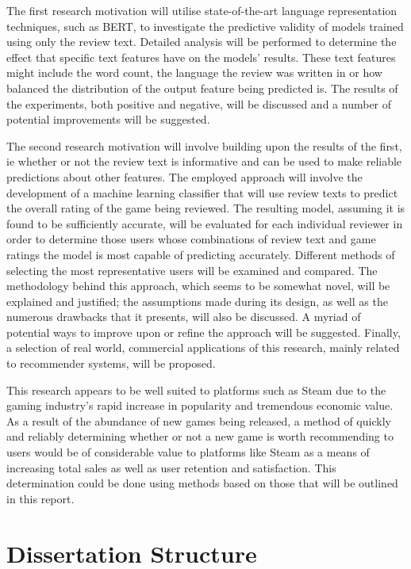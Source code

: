 The first research motivation will utilise state-of-the-art language representation techniques, such as BERT, to investigate the predictive validity of models trained using only the review text. Detailed analysis will be performed to determine the effect that specific text features have on the models' results. These text features might include the word count, the language the review was written in or how balanced the distribution of the output feature being predicted is. The results of the experiments, both positive and negative, will be discussed and a number of potential improvements will be suggested.

The second research motivation will involve building upon the results of the first, ie whether or not the review text is informative and can be used to make reliable predictions about other features. The employed approach will involve the development of a machine learning classifier that will use review texts to predict the overall rating of the game being reviewed. The resulting model, assuming it is found to be sufficiently accurate, will be evaluated for each individual reviewer in order to determine those users whose combinations of review text and game ratings the model is most capable of predicting accurately. Different methods of selecting the most representative users will be examined and compared. The methodology behind this approach, which seems to be somewhat novel, will be explained and justified; the assumptions made during its design, as well as the numerous drawbacks that it presents, will also be discussed. A myriad of potential ways to improve upon or refine the approach will be suggested. Finally, a selection of real world, commercial applications of this research, mainly related to recommender systems, will be proposed.

This research appears to be well suited to platforms such as Steam due to the gaming industry's rapid increase in popularity and tremendous economic value. As a result of the abundance of new games being released, a method of quickly and reliably determining whether or not a new game is worth recommending to users would be of considerable value to platforms like Steam as a means of increasing total sales as well as user retention and satisfaction. This determination could be done using methods based on those that will be outlined in this report.

\section{Dissertation Structure} \label{sec:Intro_Structure}

